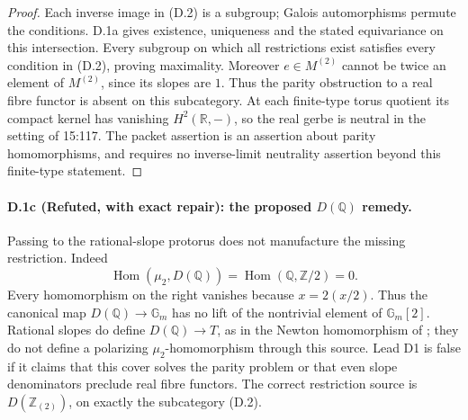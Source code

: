 \begin{proof}
Each inverse image in (D.2) is a subgroup; Galois automorphisms permute the
conditions. D.1a gives existence, uniqueness and the stated equivariance on
this intersection. Every subgroup on which all restrictions exist satisfies
every condition in (D.2), proving maximality. Moreover $e\in M^{(2)}$ cannot
be twice an element of $M^{(2)}$, since its slopes are $1$. Thus the parity
obstruction to a real fibre functor is absent on this subcategory. At each
finite-type torus quotient its compact kernel has vanishing $H^2(\mathbb R,-)$,
so the real gerbe is neutral in the setting of 15:117. The packet assertion is
an assertion about parity homomorphisms, and requires no inverse-limit
neutrality assertion beyond this finite-type statement.
\end{proof}

\paragraph{D.1c (Refuted, with exact repair): the proposed $D(\mathbb Q)$ remedy.}
Passing to the rational-slope protorus does not manufacture the missing
restriction. Indeed
\[
 \operatorname{Hom}(\mu _2,D(\mathbb Q))
       =\operatorname{Hom}(\mathbb Q,\mathbb Z/2)=0.
 \tag{D.3}
\]
Every homomorphism on the right vanishes because $x=2(x/2)$. Thus the canonical
map $D(\mathbb Q)\to\mathbb G_m$ has no lift of the nontrivial element of
$\mathbb G_m[2]$. Rational slopes do define $D(\mathbb Q)\to T$, as in the
Newton homomorphism of \citet[Introduction and \S4]{D_Kottwitz1985}; they do
not define a polarizing $\mu _2$-homomorphism through this source. Lead D1 is
false if it claims that this cover solves the parity problem or that even
slope denominators preclude real fibre functors. The correct restriction
source is $D(\mathbb Z_{(2)})$, on exactly the subcategory (D.2).

